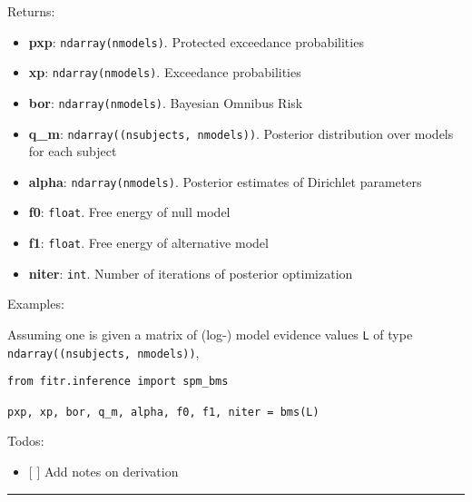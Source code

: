 Returns:

\begin{itemize}
\tightlist
\item
  \textbf{pxp}: \texttt{ndarray(nmodels)}. Protected exceedance
  probabilities
\item
  \textbf{xp}: \texttt{ndarray(nmodels)}. Exceedance probabilities
\item
  \textbf{bor}: \texttt{ndarray(nmodels)}. Bayesian Omnibus Risk
\item
  \textbf{q\_m}: \texttt{ndarray((nsubjects,\ nmodels))}. Posterior
  distribution over models for each subject
\item
  \textbf{alpha}: \texttt{ndarray(nmodels)}. Posterior estimates of
  Dirichlet parameters
\item
  \textbf{f0}: \texttt{float}. Free energy of null model
\item
  \textbf{f1}: \texttt{float}. Free energy of alternative model
\item
  \textbf{niter}: \texttt{int}. Number of iterations of posterior
  optimization
\end{itemize}

Examples:

Assuming one is given a matrix of (log-) model evidence values
\texttt{L} of type \texttt{ndarray((nsubjects,\ nmodels))},

\begin{verbatim}
from fitr.inference import spm_bms

pxp, xp, bor, q_m, alpha, f0, f1, niter = bms(L)
\end{verbatim}

Todos:

\begin{itemize}
\tightlist
\item
  {[} {]} Add notes on derivation
\end{itemize}

\begin{center}\rule{0.5\linewidth}{\linethickness}\end{center}
